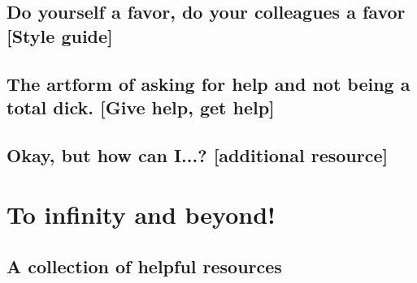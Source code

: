 \documentclass[11pt,a4paper,oldfontcommands]{memoir}
\begin{document}
    \section{Do yourself a favor, do your colleagues a favor \small{[Style guide]}}
    \label{sec:style}
    
    
    \section{The artform of asking for help and not being a total dick. \small{[Give help, get help]}}
    \label{sec:help}
    
    

\section{Okay, but how can I...? \small{[additional resource]}}


\appendix

\chapter{To infinity and beyond!}
\section{A collection of helpful resources}




\end{document}
